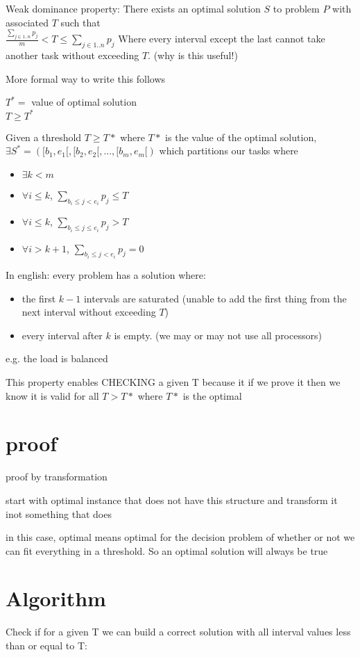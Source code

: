 \documentclass{article}
\begin{document}
Weak dominance property: There exists an optimal solution $S$ to problem $P$
with associated $T$ such that
\\$\frac{\sum_{j \in 1..n} p_j}{m} < T \leq \sum_{j \in 1..n} p_j$ 
Where every interval except the last cannot take another task without
exceeding $T$. (why is this useful!)

More formal way to write this follows

$T^* = $ value of optimal solution
\\$T \geq T^*$

Given a threshold $T \geq T*$ where $T*$ is the value of the optimal
solution, $\exists S^* = ([b_1,e_1[, [b_2,e_2[, ... , [b_m,e_m[)$ which
partitions our tasks where 
\begin{itemize}
  \item $\exists k < m$
  \item $\forall i \leq k$, $\sum_{b_i \leq j < e_i} p_j \leq T$
  \item $\forall i \leq k$, $\sum_{b_i \leq j \leq e_i} p_j > T$
  \item $\forall i > k + 1$, $\sum_{b_i \leq j < e_i} p_j = 0$
\end{itemize}

In english: every problem has a solution where:
\begin{itemize}
  \item the first $k - 1$ intervals are saturated (unable to add the first
        thing from the next interval without exceeding $T$)
  \item every interval after $k$ is empty. (we may or may not use all 
        processors)
\end{itemize}
e.g. the load is balanced

This property enables CHECKING a given T because it if we prove it then we
know it is valid for all $T > T*$ where $T*$ is the optimal

\section{proof}
proof by transformation

start with optimal instance that does not have this structure and transform
it inot something that does

in this case, optimal means optimal for the decision problem of whether or
not we can fit everything in a threshold. So an optimal solution will always
be true

\section{Algorithm}
Check if for a given T we can build a correct solution with all interval
values less than or equal to T:
\end{document}
